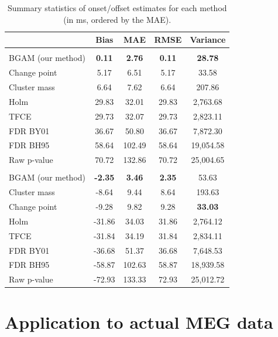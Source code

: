 \documentclass[
  doc,
  floatsintext,
  longtable,
  a4paper,
  nolmodern,
  notxfonts,
  notimes,
  colorlinks=true,linkcolor=blue,citecolor=blue,urlcolor=blue]{apa7}
\begin{document}
\begin{table}

{\caption{{Summary statistics of onset/offset estimates for each method
(in ms, ordered by the MAE).}{\label{tbl-simulation-results}}}}

\fontsize{9.0pt}{10.8pt}\selectfont
\begin{tabular*}{\linewidth}{@{\extracolsep{\fill}}lcccc}
\toprule
 & Bias & MAE & RMSE & Variance \\ 
\midrule\addlinespace[2.5pt]
\multicolumn{5}{l}{onset} \\[2.5pt] 
\midrule\addlinespace[2.5pt]
BGAM (our method) & {\bfseries 0.11} & {\bfseries 2.76} & {\bfseries 0.11} & {\bfseries 28.78} \\ 
Change point & 5.17 & 6.51 & 5.17 & 33.58 \\ 
Cluster mass & 6.64 & 7.62 & 6.64 & 207.86 \\ 
Holm & 29.83 & 32.01 & 29.83 & 2,763.68 \\ 
TFCE & 29.73 & 32.07 & 29.73 & 2,823.11 \\ 
FDR BY01 & 36.67 & 50.80 & 36.67 & 7,872.30 \\ 
FDR BH95 & 58.64 & 102.49 & 58.64 & 19,054.58 \\ 
Raw p-value & 70.72 & 132.86 & 70.72 & 25,004.65 \\ 
\midrule\addlinespace[2.5pt]
\multicolumn{5}{l}{offset} \\[2.5pt] 
\midrule\addlinespace[2.5pt]
BGAM (our method) & {\bfseries -2.35} & {\bfseries 3.46} & {\bfseries 2.35} & 53.63 \\ 
Cluster mass & -8.64 & 9.44 & 8.64 & 193.63 \\ 
Change point & -9.28 & 9.82 & 9.28 & {\bfseries 33.03} \\ 
Holm & -31.86 & 34.03 & 31.86 & 2,764.12 \\ 
TFCE & -31.84 & 34.19 & 31.84 & 2,834.11 \\ 
FDR BY01 & -36.68 & 51.37 & 36.68 & 7,648.53 \\ 
FDR BH95 & -58.87 & 102.63 & 58.87 & 18,939.58 \\ 
Raw p-value & -72.93 & 133.33 & 72.93 & 25,012.72 \\ 
\bottomrule
\end{tabular*}

\end{table}

\section{Application to actual MEG
data}\label{application-to-actual-meg-data}
\end{document}
